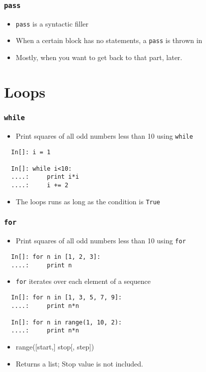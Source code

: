 \begin{frame}[fragile]
  \frametitle{\texttt{pass}}
  \begin{itemize}
  \item \texttt{pass} is a syntactic filler
  \item When a certain block has no statements, a \texttt{pass} is
    thrown in
  \item Mostly, when you want to get back to that part, later.
  \end{itemize}
\end{frame}

\section{Loops}

\begin{frame}[fragile]
  \frametitle{\texttt{while}}
  \begin{itemize}
  \item Print squares of all odd numbers less than 10 using
    \texttt{while} 
  \end{itemize}
  \begin{lstlisting}
  In[]: i = 1

  In[]: while i<10:
  ....:     print i*i
  ....:     i += 2
  \end{lstlisting}
  \begin{itemize}
  \item The loops runs as long as the condition is \texttt{True}
  \end{itemize}
\end{frame}

\begin{frame}[fragile]
  \frametitle{\texttt{for}}
  \begin{itemize}
  \item Print squares of all odd numbers less than 10 using
    \texttt{for}
  \end{itemize}
  \begin{lstlisting}
  In[]: for n in [1, 2, 3]:
  ....:     print n
  \end{lstlisting}
  \begin{itemize}
  \item \texttt{for} iterates over each element of a sequence
  \end{itemize}
  \begin{lstlisting}
  In[]: for n in [1, 3, 5, 7, 9]: 
  ....:     print n*n

  In[]: for n in range(1, 10, 2):
  ....:     print n*n
  \end{lstlisting}
  \begin{itemize}
  \item \alert{range([start,] stop[, step])}
  \item Returns a list; Stop value is not included. 
  \end{itemize}
\end{frame}


